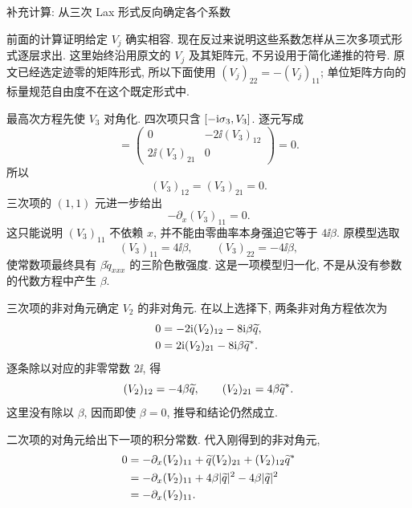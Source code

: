 \par\medskip\noindent 补充计算: 从三次 Lax 形式反向确定各个系数\par
前面的计算证明给定 $V_j$ 确实相容. 现在反过来说明这些系数怎样从三次多项式形式逐层求出. 这里始终沿用原文的 $V_j$ 及其矩阵元, 不另设用于简化递推的符号. 原文已经选定迹零的矩阵形式, 所以下面使用 $(V_j)_{22}=-(V_j)_{11}$; 单位矩阵方向的标量规范自由度不在这个既定形式中.
\par\smallskip\noindent 最高次方程先使 $V_3$ 对角化.\quad
四次项只含 $[-\mathrm{i}\sigma_3,V_3]$. 逐元写成
\begin{equation*}
[-\ii\sg,V_3]
=\begin{pmatrix}
0&-2\ii(V_3)_{12}\\
2\ii(V_3)_{21}&0
\end{pmatrix}=0.
\end{equation*}
所以
\begin{equation*}
(V_3)_{12}=(V_3)_{21}=0.
\end{equation*}
三次项的 $(1,1)$ 元进一步给出
\begin{equation*}
-\partial_x(V_3)_{11}=0.
\end{equation*}
这只能说明 $(V_3)_{11}$ 不依赖 $x$, 并不能由零曲率本身强迫它等于 $4\ii\beta$. 原模型选取
\begin{equation*}
(V_3)_{11}=4\ii\beta,
\qquad
(V_3)_{22}=-4\ii\beta,
\end{equation*}
使常数项最终具有 $\beta\widetilde q_{xxx}$ 的三阶色散强度. 这是一项模型归一化, 不是从没有参数的代数方程中产生 $\beta$.
\par\smallskip\noindent 三次项的非对角元确定 $V_2$ 的非对角元.\quad
在以上选择下, 两条非对角方程依次为
\begin{align*}
0&=-2\mathrm{i}(V_2)_{12}-8\mathrm{i}\beta\widetilde q,\\
0&=2\mathrm{i}(V_2)_{21}-8\mathrm{i}\beta{\widetilde q}^{*}.
\end{align*}
逐条除以对应的非零常数 $2\ii$, 得
\begin{equation*}
(V_2)_{12}=-4\beta\widetilde q,
\qquad
(V_2)_{21}=4\beta{\widetilde q}^{*}.
\end{equation*}
这里没有除以 $\beta$, 因而即使 $\beta=0$, 推导和结论仍然成立.
\par\smallskip\noindent 二次项的对角元给出下一项的积分常数.\quad
代入刚得到的非对角元,
\begin{align*}
0
&=-\partial_x(V_2)_{11}
+\widetilde q(V_2)_{21}
+(V_2)_{12}{\widetilde q}^{*}\\
&=-\partial_x(V_2)_{11}
+4\beta|\widetilde q|^2-4\beta|\widetilde q|^2\\
&=-\partial_x(V_2)_{11}.
\end{align*}
